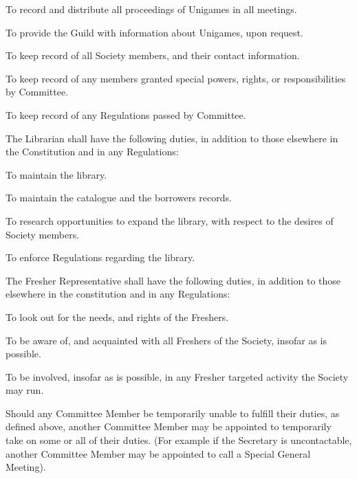 \documentclass[a4paper]{article}
\begin{document}
\begin{myEnumerate}
        \begin{myEnumerate}
            \item To record and distribute all proceedings of Unigames in all meetings.
            \item To provide the Guild with information about Unigames, upon request.
            \item To keep record of all Society members, and their contact information.
            \item To keep record of any members granted special powers, rights, or responsibilities by Committee.
            \item To keep record of any Regulations passed by Committee.
        \end{myEnumerate}
    \item The Librarian shall have the following duties, in addition to those elsewhere in the Constitution and in any Regulations:
        \begin{myEnumerate}
            \item To maintain the library.
            \item To maintain the catalogue and the borrowers records.
            \item To research opportunities to expand the library, with respect to the desires of Society members.
            \item To enforce Regulations regarding the library.
        \end{myEnumerate}
    \item The Fresher Representative shall have the following duties, in addition to those elsewhere in the constitution and in any Regulations:
        \begin{myEnumerate}
            \item To look out for the needs, and rights of the Freshers.
            \item To be aware of, and acquainted with all Freshers of the Society, insofar as is possible.
            \item To be involved, insofar as is possible, in any Fresher targeted activity the Society may run.
        \end{myEnumerate}
    \item Should any Committee Member be temporarily unable to fulfill their duties, as defined above, another Committee Member may be appointed to temporarily take on some or all of their duties. (For example if the Secretary is uncontactable, another Committee Member may be appointed to call a Special General Meeting).
\end{myEnumerate}
\end{document}

